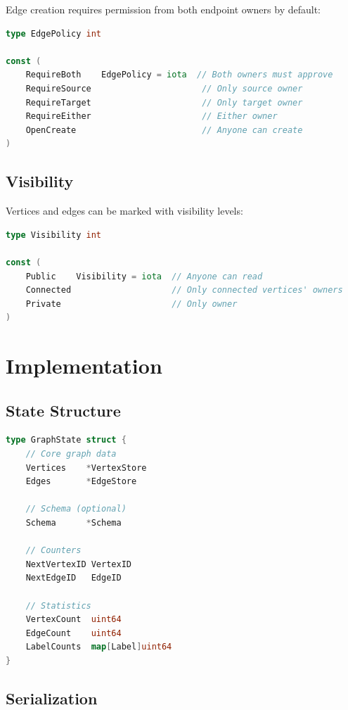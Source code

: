 \documentclass[11pt,a4paper]{article}
\theoremstyle{definition}
\begin{document}
Edge creation requires permission from both endpoint owners by default:

\begin{lstlisting}[language=Go]
type EdgePolicy int

const (
    RequireBoth    EdgePolicy = iota  // Both owners must approve
    RequireSource                      // Only source owner
    RequireTarget                      // Only target owner
    RequireEither                      // Either owner
    OpenCreate                         // Anyone can create
)
\end{lstlisting}

\subsection{Visibility}

Vertices and edges can be marked with visibility levels:

\begin{lstlisting}[language=Go]
type Visibility int

const (
    Public    Visibility = iota  // Anyone can read
    Connected                    // Only connected vertices' owners
    Private                      // Only owner
)
\end{lstlisting}

\section{Implementation}

\subsection{State Structure}

\begin{lstlisting}[language=Go]
type GraphState struct {
    // Core graph data
    Vertices    *VertexStore
    Edges       *EdgeStore

    // Schema (optional)
    Schema      *Schema

    // Counters
    NextVertexID VertexID
    NextEdgeID   EdgeID

    // Statistics
    VertexCount  uint64
    EdgeCount    uint64
    LabelCounts  map[Label]uint64
}
\end{lstlisting}

\subsection{Serialization}
\end{document}
